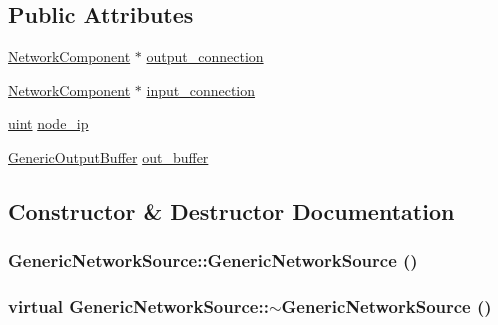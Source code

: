 \subsection*{Public Attributes}
\begin{CompactItemize}
\item 
\hyperlink{classNetworkComponent}{NetworkComponent} $\ast$ \hyperlink{classGenericNetworkSource_394c482da644893d93513f202850cec0}{output\_\-connection}
\item 
\hyperlink{classNetworkComponent}{NetworkComponent} $\ast$ \hyperlink{classGenericNetworkSource_49ae0bba9107dfecd501b5ba5ff9ddc1}{input\_\-connection}
\item 
\hyperlink{outputBuffer_8h_91ad9478d81a7aaf2593e8d9c3d06a14}{uint} \hyperlink{classGenericNetworkSource_90d400349086508bb6b2b46fbd24ed9b}{node\_\-ip}
\item 
\hyperlink{classGenericOutputBuffer}{GenericOutputBuffer} \hyperlink{classGenericNetworkSource_5d6de27fc38a82fa7efd029ab79e4ab6}{out\_\-buffer}
\end{CompactItemize}


\subsection{Constructor \& Destructor Documentation}
\hypertarget{classGenericNetworkSource_66fa04f8ab4c8ac70192f63249f8b387}{
\subsubsection[{GenericNetworkSource}]{\setlength{\rightskip}{0pt plus 5cm}GenericNetworkSource::GenericNetworkSource ()}}
\label{classGenericNetworkSource_66fa04f8ab4c8ac70192f63249f8b387}


\hypertarget{classGenericNetworkSource_de83e8c46d7c400be8bdd2cf1e33d765}{
\subsubsection[{$\sim$GenericNetworkSource}]{\setlength{\rightskip}{0pt plus 5cm}virtual GenericNetworkSource::$\sim$GenericNetworkSource ()}}
\label{classGenericNetworkSource_de83e8c46d7c400be8bdd2cf1e33d765}




